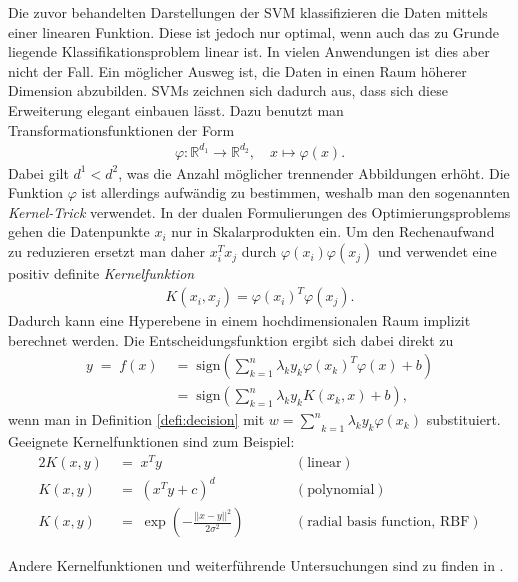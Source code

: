 Die zuvor behandelten Darstellungen der SVM klassifizieren die Daten mittels einer linearen Funktion. Diese ist jedoch nur optimal, wenn auch das zu Grunde liegende Klassifikationsproblem linear ist. In vielen Anwendungen ist dies aber nicht der Fall. Ein möglicher Ausweg ist, die Daten in einen Raum höherer Dimension abzubilden. SVMs zeichnen sich dadurch aus, dass sich diese Erweiterung elegant einbauen lässt. Dazu benutzt man Transformationsfunktionen der Form
\begin{align*}
	\varphi \colon \mathbb {R} ^{d_{1}}\rightarrow \mathbb {R} ^{d_{2}},\quad x \mapsto \varphi (x).
\end{align*}
Dabei gilt \(d^1<d^2\), was die Anzahl möglicher trennender Abbildungen erhöht. Die Funktion \(\varphi\) ist allerdings aufwändig zu bestimmen, weshalb man den sogenannten \textit{Kernel-Trick} verwendet. In der dualen Formulierungen des Optimierungsproblems gehen die Datenpunkte \(x_i\) nur in Skalarprodukten ein. Um den Rechenaufwand zu reduzieren ersetzt man daher \(x_i^Tx_j\) durch \(\varphi(x_i)\varphi(x_j)\) und verwendet eine positiv definite \textit{Kernelfunktion}
\begin{align*}
	K(x_{i},x_{j})=\varphi (x_{i})^T\varphi (x_{j}).
\end{align*}
Dadurch kann eine Hyperebene in einem hochdimensionalen Raum implizit berechnet werden. Die Entscheidungsfunktion ergibt sich dabei direkt zu
\begin{align*}
	y\;=\;f(x)&\;=\;\text{sign}\left(\sum_{k=1}^{n}\lambda_ky_k\varphi(x_k)^T\varphi(x)+b\right)\\
	&\;=\;\text{sign}\left(\sum_{k=1}^{n}\lambda_ky_kK\left(x_k,x\right)+b\right),
\end{align*}
wenn man in Definition \autoref{defi:decision} mit \(w=\underset{k=1}{\overset{n}{\sum}}\lambda_ky_k\varphi(x_k)\) substituiert.\\[0,3cm]

Geeignete Kernelfunktionen sind zum Beispiel:
\begin{alignat*}{2}
	K(x,y)&\;=\;x^Ty && (\text{linear})\\
	K(x,y)&\;=\;\left(x^Ty+c\right)^d && (\text{polynomial})\\
	K(x,y)&\;=\;\exp \left(-{\tfrac {||x-y||^{{2}}}{2\sigma ^{{2}}}}\right) \qquad&& (\text{radial basis function, RBF})
\end{alignat*}

Andere Kernelfunktionen und weiterführende Untersuchungen sind zu finden in \cite{Kernel}.


